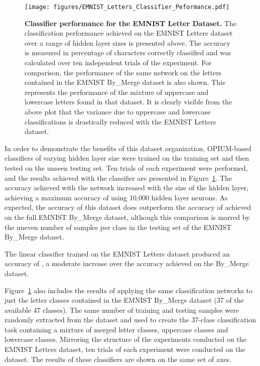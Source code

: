 \documentclass[conference]{IEEEtran}
\begin{document}
\begin{figure}
  \centering
  \texttt{[image: figures/EMNIST\_Letters\_Classifier\_Peformance.pdf]}
  \caption{\textbf{Classifier performance for the EMNIST Letter Dataset.} The classification performance achieved on the EMNIST Letters dataset over a range of hidden layer sizes is presented above. The accuracy is measured in percentage of characters correctly classified and was calculated over ten independent trials of the experiment. For comparison, the performance of the same network on the letters contained in the EMNIST By\_Merge dataset is also shown. This represents the performance of the mixture of uppercase and lowercase letters found in that dataset. It is clearly visible from the above plot that the variance due to uppercase and lowercase classifications is drastically reduced with the EMNIST Letters dataset.}
  \label{fig:results-emnist-letters}
\end{figure}

In order to demonstrate the benefits of this dataset organization, OPIUM-based classifiers of varying hidden layer size were trained on the training set and then tested on the unseen testing set. Ten trials of each experiment were performed, and the results achieved with the classifier are presented in Figure~\ref{fig:results-emnist-letters}. The accuracy achieved with the network increased with the size of the hidden layer, achieving a maximum accuracy of  using 10,000 hidden layer neurons. As expected, the accuracy of this dataset does outperform the accuracy of  achieved on the full EMNIST By\_Merge dataset, although this comparison is marred by the uneven number of samples per class in the testing set of the EMNIST By\_Merge dataset.

The linear classifier trained on the EMNIST Letters dataset produced an accuracy of , a moderate increase over the accuracy achieved on the By\_Merge dataset.

Figure~\ref{fig:results-emnist-letters} also includes the results of applying the same classification networks to just the letter classes contained in the EMNIST By\_Merge dataset (37 of the available 47 classes). The same number of training and testing samples were randomly extracted from the dataset and used to create the 37-class classification task containing a mixture of merged letter classes, uppercase classes and lowercase classes. Mirroring the structure of the experiments conducted on the EMNIST Letters dataset, ten trials of each experiment were conducted on the dataset. The results of these classifiers are shown on the same set of axes.
\end{document}
